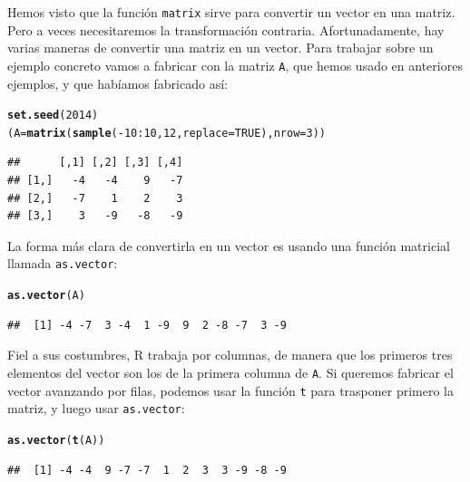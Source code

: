 \documentclass[10pt,a4paper]{article}\usepackage[]{graphicx}\usepackage[]{color}
\makeatletter
\newcommand{\hlnum}[1]{\textcolor[rgb]{0.686,0.059,0.569}{#1}}%
\newcommand{\hlopt}[1]{\textcolor[rgb]{0,0,0}{#1}}%
\newcommand{\hlstd}[1]{\textcolor[rgb]{0.345,0.345,0.345}{#1}}%
\newcommand{\hlkwb}[1]{\textcolor[rgb]{0.69,0.353,0.396}{#1}}%
\newcommand{\hlkwc}[1]{\textcolor[rgb]{0.333,0.667,0.333}{#1}}%
\newcommand{\hlkwd}[1]{\textcolor[rgb]{0.737,0.353,0.396}{\textbf{#1}}}%
\newenvironment{kframe}{%
 \def\at@end@of@kframe{}%
 \ifinner\ifhmode%
  \def\at@end@of@kframe{\end{minipage}}%
  \begin{minipage}{\columnwidth}%
 \fi\fi%
 \def\FrameCommand##1{\hskip\@totalleftmargin \hskip-\fboxsep
 \colorbox{shadecolor}{##1}\hskip-\fboxsep
     \hskip-\linewidth \hskip-\@totalleftmargin \hskip\columnwidth}%
 \MakeFramed {\advance\hsize-\width
   \@totalleftmargin\z@ \linewidth\hsize
   \@setminipage}}%
 {\par\unskip\endMakeFramed%
 \at@end@of@kframe}
\newenvironment{knitrout}{}{} %
\newcounter {cont01}
\makeatother
\begin{document}
Hemos visto que la función {\tt matrix} sirve para convertir un vector en una matriz. Pero a veces necesitaremos la transformación contraria. Afortunadamente, hay varias maneras de convertir una matriz en un vector. Para trabajar sobre un ejemplo concreto vamos a fabricar con la matriz {\tt A}, que hemos usado en anteriores ejemplos, y que habíamos fabricado así:
\begin{knitrout}
\color{fgcolor}\begin{kframe}
\begin{alltt}
    \hlkwd{set.seed}\hlstd{(}\hlnum{2014}\hlstd{)}
    \hlstd{(A} \hlkwb{=} \hlkwd{matrix}\hlstd{(}\hlkwd{sample}\hlstd{(}\hlopt{-}\hlnum{10}\hlopt{:}\hlnum{10}\hlstd{,} \hlnum{12}\hlstd{,} \hlkwc{replace}\hlstd{=}\hlnum{TRUE}\hlstd{),} \hlkwc{nrow}\hlstd{=}\hlnum{3}\hlstd{))}
\end{alltt}
\begin{verbatim}
##      [,1] [,2] [,3] [,4]
## [1,]   -4   -4    9   -7
## [2,]   -7    1    2    3
## [3,]    3   -9   -8   -9
\end{verbatim}
\end{kframe}
\end{knitrout}
La forma más clara de convertirla en un vector es usando una función matricial llamada {\tt as.vector}:
\begin{knitrout}
\color{fgcolor}\begin{kframe}
\begin{alltt}
    \hlkwd{as.vector}\hlstd{(A)}
\end{alltt}
\begin{verbatim}
##  [1] -4 -7  3 -4  1 -9  9  2 -8 -7  3 -9
\end{verbatim}
\end{kframe}
\end{knitrout}
Fiel a sus costumbres, R trabaja por columnas, de manera que los primeros tres elementos del vector son los de la primera columna de {\tt A}. Si queremos fabricar el vector avanzando por filas, podemos usar la función {\tt t} para trasponer primero la matriz, y luego usar {\tt as.vector}:
\begin{knitrout}
\color{fgcolor}\begin{kframe}
\begin{alltt}
    \hlkwd{as.vector}\hlstd{(}\hlkwd{t}\hlstd{(A))}
\end{alltt}
\begin{verbatim}
##  [1] -4 -4  9 -7 -7  1  2  3  3 -9 -8 -9
\end{verbatim}
\end{kframe}
\end{knitrout}
\end{document}
